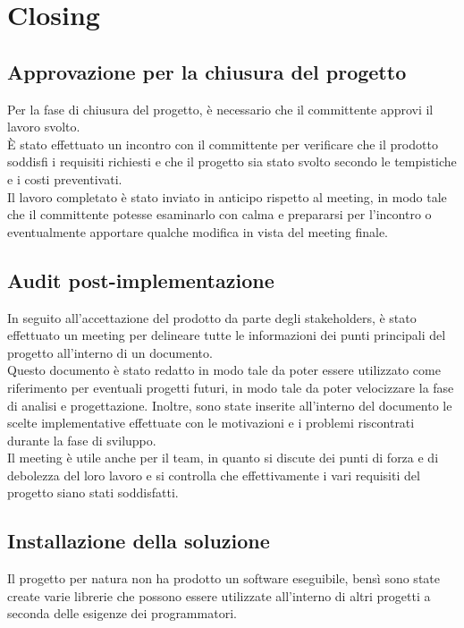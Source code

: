\section{Closing}


\subsection{Approvazione per la chiusura del progetto}
Per la fase di chiusura del progetto, è necessario che il committente approvi il lavoro svolto.\\

È stato effettuato un incontro con il committente per verificare che il prodotto soddisfi i requisiti richiesti e che il progetto sia stato svolto secondo le tempistiche e i costi preventivati.\\

Il lavoro completato è stato inviato in anticipo rispetto al meeting, in modo tale che il committente potesse esaminarlo con calma e prepararsi per l'incontro o eventualmente apportare qualche modifica in vista del meeting finale.\\


\subsection{Audit post-implementazione}
In seguito all'accettazione del prodotto da parte degli stakeholders, è stato effettuato un meeting per delineare tutte le informazioni dei punti principali del progetto all'interno di un documento.\\

Questo documento è stato redatto in modo tale da poter essere utilizzato come riferimento per eventuali progetti futuri, in modo tale da poter velocizzare la fase di analisi e progettazione.
Inoltre, sono state inserite all'interno del documento le scelte implementative effettuate con le motivazioni e i problemi riscontrati durante la fase di sviluppo.\\

Il meeting è utile anche per il team, in quanto si discute dei punti di forza e di debolezza del loro lavoro e si controlla che effettivamente i vari requisiti del progetto siano stati soddisfatti.\\

\subsection{Installazione della soluzione}
Il progetto per natura non ha prodotto un software eseguibile, bensì sono state create varie librerie che possono essere utilizzate all'interno di altri progetti a seconda delle esigenze dei programmatori.\\


